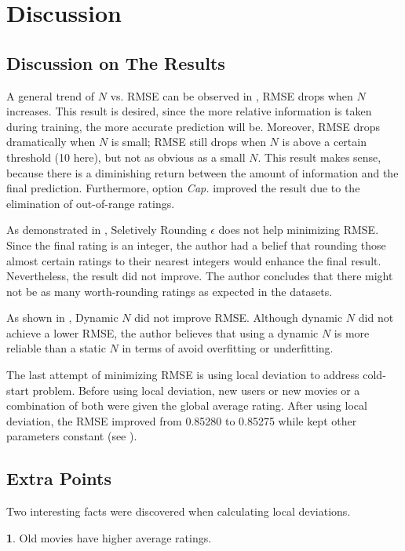 \documentclass{ece}
\begin{document}
\section{Discussion}

\subsection{Discussion on The Results}

A general trend of $N$ vs. RMSE can be observed in , RMSE drops when $N$ increases.
This result is desired, since the more relative information is taken during training, the more accurate prediction will be.
Moreover, RMSE drops dramatically when $N$ is small; RMSE still drops when $N$ is above a certain threshold (10 here), but not as obvious as a small $N$.
This result makes sense, because there is a diminishing return between the amount of information and the final prediction.
Furthermore, option \textit{Cap.} improved the result due to the elimination of out-of-range ratings.

As demonstrated in , Seletively Rounding $\epsilon$ does not help minimizing RMSE.
Since the final rating is an integer, the author had a belief that rounding those almost certain ratings to their nearest integers would enhance the final result.
Nevertheless, the result did not improve.
The author concludes that there might not be as many worth-rounding ratings as expected in the datasets.

As shown in , Dynamic $N$ did not improve RMSE.
Although dynamic $N$ did not achieve a lower RMSE, the author believes that using a dynamic $N$ is more reliable than a static $N$ in terms of avoid overfitting or underfitting.

The last attempt of minimizing RMSE is using local deviation to address cold-start problem.
Before using local deviation, new users or new movies or a combination of both were given the global average rating.
After using local deviation, the RMSE improved from 0.85280 to 0.85275 while kept other parameters constant (see ).

\subsection{Extra Points}

Two interesting facts were discovered when calculating local deviations.

\textbf{1}. Old movies have higher average ratings.
\end{document}
